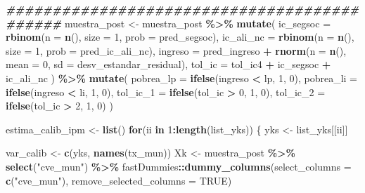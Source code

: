 \documentclass[
  12pt,
]{book}
\newenvironment{Shaded}{\begin{snugshade}}{\end{snugshade}}
\newcommand{\AttributeTok}[1]{\textcolor[rgb]{0.13,0.29,0.53}{#1}}
\newcommand{\ConstantTok}[1]{\textcolor[rgb]{0.56,0.35,0.01}{#1}}
\newcommand{\ControlFlowTok}[1]{\textcolor[rgb]{0.13,0.29,0.53}{\textbf{#1}}}
\newcommand{\DecValTok}[1]{\textcolor[rgb]{0.00,0.00,0.81}{#1}}
\newcommand{\DocumentationTok}[1]{\textcolor[rgb]{0.56,0.35,0.01}{\textbf{\textit{#1}}}}
\newcommand{\FunctionTok}[1]{\textcolor[rgb]{0.13,0.29,0.53}{\textbf{#1}}}
\newcommand{\NormalTok}[1]{#1}
\newcommand{\OtherTok}[1]{\textcolor[rgb]{0.56,0.35,0.01}{#1}}
\newcommand{\SpecialCharTok}[1]{\textcolor[rgb]{0.81,0.36,0.00}{\textbf{#1}}}
\newcommand{\StringTok}[1]{\textcolor[rgb]{0.31,0.60,0.02}{#1}}
\begin{document}
\begin{Shaded}
\begin{Highlighting}[]
    \DocumentationTok{\#\#\#\#\#\#\#\#\#\#\#\#\#\#\#\#\#\#\#\#\#\#\#\#\#\#\#\#\#\#\#\#\#\#\#\#\#\#\#\#\#\#\#\#}
\NormalTok{    muestra\_post }\OtherTok{\textless{}{-}}\NormalTok{ muestra\_post }\SpecialCharTok{\%\textgreater{}\%}
      \FunctionTok{mutate}\NormalTok{(}
        \AttributeTok{ic\_segsoc =} \FunctionTok{rbinom}\NormalTok{(}\AttributeTok{n =} \FunctionTok{n}\NormalTok{(), }\AttributeTok{size =} \DecValTok{1}\NormalTok{, }\AttributeTok{prob =}\NormalTok{ pred\_segsoc),}
        \AttributeTok{ic\_ali\_nc =} \FunctionTok{rbinom}\NormalTok{(}\AttributeTok{n =} \FunctionTok{n}\NormalTok{(), }\AttributeTok{size =} \DecValTok{1}\NormalTok{, }\AttributeTok{prob =}\NormalTok{ pred\_ic\_ali\_nc),}
        \AttributeTok{ingreso =}\NormalTok{ pred\_ingreso }\SpecialCharTok{+} \FunctionTok{rnorm}\NormalTok{(}\AttributeTok{n =} \FunctionTok{n}\NormalTok{(), }\AttributeTok{mean =} \DecValTok{0}\NormalTok{, }\AttributeTok{sd =}\NormalTok{ desv\_estandar\_residual),}
        \AttributeTok{tol\_ic =}\NormalTok{ tol\_ic4 }\SpecialCharTok{+}\NormalTok{ ic\_segsoc }\SpecialCharTok{+}\NormalTok{ ic\_ali\_nc}
\NormalTok{      ) }\SpecialCharTok{\%\textgreater{}\%}
      \FunctionTok{mutate}\NormalTok{(}
        \AttributeTok{pobrea\_lp =} \FunctionTok{ifelse}\NormalTok{(ingreso }\SpecialCharTok{\textless{}}\NormalTok{ lp, }\DecValTok{1}\NormalTok{, }\DecValTok{0}\NormalTok{),}
        \AttributeTok{pobrea\_li =} \FunctionTok{ifelse}\NormalTok{(ingreso }\SpecialCharTok{\textless{}}\NormalTok{ li, }\DecValTok{1}\NormalTok{, }\DecValTok{0}\NormalTok{),}
        \AttributeTok{tol\_ic\_1 =} \FunctionTok{ifelse}\NormalTok{(tol\_ic }\SpecialCharTok{\textgreater{}} \DecValTok{0}\NormalTok{, }\DecValTok{1}\NormalTok{, }\DecValTok{0}\NormalTok{),}
        \AttributeTok{tol\_ic\_2 =} \FunctionTok{ifelse}\NormalTok{(tol\_ic }\SpecialCharTok{\textgreater{}} \DecValTok{2}\NormalTok{, }\DecValTok{1}\NormalTok{, }\DecValTok{0}\NormalTok{)}
\NormalTok{      )}

\NormalTok{    estima\_calib\_ipm }\OtherTok{\textless{}{-}} \FunctionTok{list}\NormalTok{()}
    \ControlFlowTok{for}\NormalTok{(ii }\ControlFlowTok{in} \DecValTok{1}\SpecialCharTok{:}\FunctionTok{length}\NormalTok{(list\_yks)) \{}
\NormalTok{      yks }\OtherTok{\textless{}{-}}\NormalTok{ list\_yks[[ii]]}
      
\NormalTok{      var\_calib }\OtherTok{\textless{}{-}} \FunctionTok{c}\NormalTok{(yks, }\FunctionTok{names}\NormalTok{(tx\_mun))}
\NormalTok{      Xk }\OtherTok{\textless{}{-}}\NormalTok{ muestra\_post }\SpecialCharTok{\%\textgreater{}\%} \FunctionTok{select}\NormalTok{(}\StringTok{"cve\_mun"}\NormalTok{) }\SpecialCharTok{\%\textgreater{}\%}
\NormalTok{        fastDummies}\SpecialCharTok{::}\FunctionTok{dummy\_columns}\NormalTok{(}\AttributeTok{select\_columns =} \FunctionTok{c}\NormalTok{(}\StringTok{"cve\_mun"}\NormalTok{), }\AttributeTok{remove\_selected\_columns =} \ConstantTok{TRUE}\NormalTok{)}
      

\end{Highlighting}
\end{Shaded}
\end{document}

